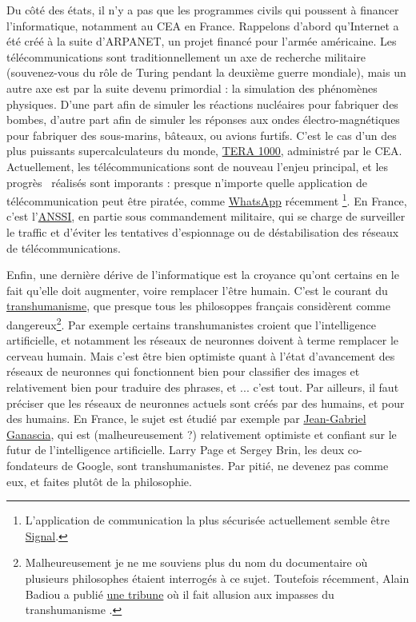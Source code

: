 \documentclass[10pt]{article}
\begin{document}
Du côté des états, il n'y a pas que les programmes civils qui poussent à financer l'informatique, notamment au CEA en France.
Rappelons d'abord qu'Internet a été créé à la suite d'ARPANET, un projet financé pour l'armée américaine. Les télécommunications
sont traditionnellement un axe de recherche militaire (souvenez-vous du rôle de Turing pendant la deuxième guerre mondiale),
mais un autre axe est par la suite devenu primordial : la simulation des phénomènes physiques. D'une part afin de simuler les réactions
nucléaires pour fabriquer des bombes, d'autre part afin de simuler les réponses aux ondes électro-magnétiques pour fabriquer
des sous-marins, bâteaux, ou avions furtifs. C'est le cas d'un des plus puissants supercalculateurs du monde,
\href{https://fr.wikipedia.org/wiki/TERA-1000}{TERA 1000}, administré par le CEA. Actuellement, les télécommunications sont de nouveau
l'enjeu principal, et les \og progrès \fg~réalisés sont imporants : presque n'importe quelle application de télécommunication peut être
piratée, comme
\href{https://www.lemonde.fr/pixels/article/2019/05/14/une-faille-de-securite-de-whatsapp-utilisee-pour-installer-un-logiciel-espion-israelien_5461861_4408996.html}{WhatsApp}
récemment \footnote{L'application de communication la plus sécurisée actuellement semble être \href{https://signal.org/fr/}{Signal}.}.
En France, c'est l'\href{https://www.ssi.gouv.fr/}{ANSSI}, en partie sous commandement militaire, qui se charge de surveiller le traffic et d'éviter les tentatives d'espionnage
ou de déstabilisation des réseaux de télécommunications.


Enfin, une dernière dérive de l'informatique est la croyance qu'ont certains en
le fait qu'elle doit augmenter, voire remplacer l'être humain. C'est le courant du \href{https://fr.wikipedia.org/wiki/Transhumanisme}{transhumanisme},
que presque tous les philosoppes français considèrent comme dangereux\footnote{
  Malheureusement je ne me souviens plus du nom du documentaire où plusieurs philosophes étaient interrogés à ce sujet.
  Toutefois récemment, Alain Badiou a publié
  \href{https://www.lemonde.fr/series-d-ete-2018-long-format/article/2018/07/26/le-capitalisme-seul-responsable-de-l-exploitation-destructrice-de-la-nature_5336333_5325928.html?xtmc=badiou_capitalisme&xtcr=1}{une tribune}
  où il fait allusion aux \og impasses du transhumanisme \fg.
}.
Par exemple certains transhumanistes croient que l'intelligence artificielle, et notamment les réseaux de neuronnes
doivent à terme remplacer le cerveau humain. Mais c'est être bien optimiste quant à l'état d'avancement des réseaux
de neuronnes qui fonctionnent bien pour classifier des images et relativement bien pour traduire des phrases, et ... c'est tout.
Par ailleurs, il faut préciser que les réseaux de neuronnes actuels sont créés par des humains, et pour des humains.
En France, le sujet est étudié par exemple par \href{https://fr.wikipedia.org/wiki/Jean-Gabriel_Ganascia}{Jean-Gabriel Ganascia},
qui est (malheureusement ?) relativement optimiste et confiant sur le futur de l'intelligence artificielle. 
Larry Page et Sergey Brin, les deux co-fondateurs de Google, sont transhumanistes.
Par pitié, ne devenez pas comme eux, et faites plutôt de la philosophie.
\end{document}

